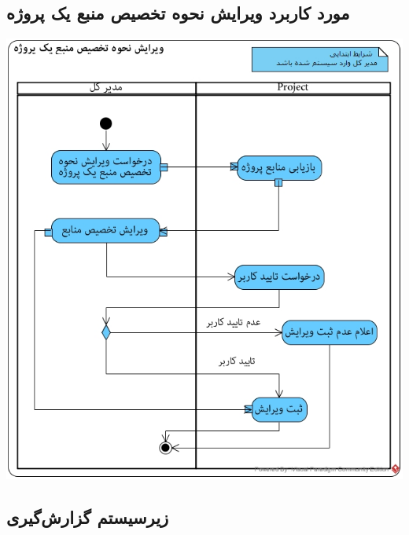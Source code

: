 \subsection*{مورد کاربرد ویرایش نحوه تخصیص منبع یک پروژه}
\vspace{2cm}
\begin{center}
\includegraphics[width=\textwidth]{ActivityDiagramsWithSwimlanes/39.jpg}
\end{center}



\newpage
\subsection{زیرسیستم گزارش‌گیری}

\vspace{2cm}
